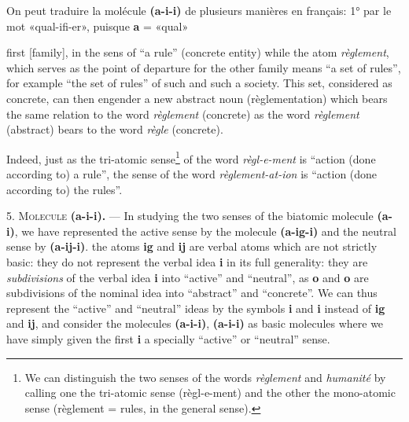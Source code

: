 \begin{sloppypar}
{{    On peut traduire la molécule \textbf{(a-i-i)} de plusieurs
    manières en français: 1° par le mot «qual-ifi-er», puisque
    \textbf{a} = «qual»}


}
% 
{\noindent
  {\small
    first [family], in the sens of ``a rule'' (concrete entity) while
    the atom \emph{règlement}, which serves as the point of departure
    for the other family means ``a set of rules'', for example ``the
    set of rules'' of such and such a society. This set, considered as
    concrete, can then engender a new abstract noun (règlementation)
    which bears the same relation to the word \emph{règlement}
    (concrete) as the word \emph{règlement} (abstract) bears to the
    word \emph{règle} (concrete).

    Indeed, just as the tri-atomic sense\footnote{We can distinguish
      the two senses of the words \emph{règlement} and \emph{humanité}
      by calling one the tri-atomic sense (règl-e-ment) and the other
      the mono-atomic sense (règlement = rules, in the general
      sense).}  of the word \emph{règl-e-ment} is ``action (done
    according to) a rule'', the sense of the word
    \emph{règlement-at-ion} is ``action (done according to) the
    rules''.

    5. \textsc{Molecule} \textbf{(a-i-i).} — In studying the two
    senses of the biatomic molecule \textbf{(a-i)}, we have
    represented the active sense by the molecule \textbf{(a-ig-i)} and
    the neutral sense by \textbf{(a-ij-i)}. the atoms \textbf{ig} and
    \textbf{ij} are verbal atoms which are not strictly basic: they do
    not represent the verbal idea \textbf{i} in its full generality:
    they are \emph{subdivisions} of the verbal idea \textbf{i} into
    ``active'' and ``neutral'', as \textbf{o} and \textbf{o}
    are subdivisions of the nominal idea into ``abstract'' and
    ``concrete''. We can thus represent the ``active'' and ``neutral''
    ideas by the symbols \textbf{i} and \textbf{i} instead of
    \textbf{ig} and \textbf{ij}, and consider the molecules
    \textbf{(a-i-i)}, \textbf{(a-i-i)} as basic molecules
    where we have
    simply given the first \textbf{i} a specially
    ``active'' or ``neutral'' \mbox{sense\footnotemark.}

}}
\end{sloppypar}
